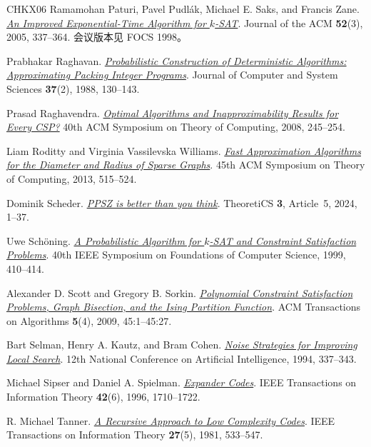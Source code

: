 \documentclass[11pt,reqno]{amsart}
\numberwithin{equation}{section}
\theoremstyle{definition}\newtheorem{definition}[theorem]{定义}
\theoremstyle{remark}\newtheorem{remark}[theorem]{注}
\begin{document}
\begin{thebibliography}{CHKX06}
Ramamohan Paturi, Pavel Pudl\'ak, Michael E. Saks, and Francis Zane.
\href{https://doi.org/10.1145/1066100.1066101}
{\emph{An Improved Exponential-Time Algorithm for $k$-SAT}}.
Journal of the ACM \textbf{52}(3), 2005, 337--364.
会议版本见 FOCS 1998。

Prabhakar Raghavan.
\href{https://doi.org/10.1016/0022-0000(88)90003-7}
{\emph{Probabilistic Construction of Deterministic Algorithms:
Approximating Packing Integer Programs}}.
Journal of Computer and System Sciences \textbf{37}(2), 1988, 130--143.

Prasad Raghavendra.
\href{https://doi.org/10.1145/1374376.1374414}
{\emph{Optimal Algorithms and Inapproximability Results for Every CSP?}}
40th ACM Symposium on Theory of Computing, 2008, 245--254.

Liam Roditty and Virginia Vassilevska Williams.
\href{https://doi.org/10.1145/2488608.2488673}
{\emph{Fast Approximation Algorithms for the Diameter and Radius of Sparse Graphs}}.
45th ACM Symposium on Theory of Computing, 2013, 515--524.

Dominik Scheder.
\href{https://doi.org/10.46298/theoretics.24.5}
{\emph{PPSZ is better than you think}}.
TheoretiCS \textbf{3}, Article~5, 2024, 1--37.

Uwe Sch\"oning.
\href{https://doi.org/10.1109/SFFCS.1999.814612}
{\emph{A Probabilistic Algorithm for $k$-SAT and Constraint Satisfaction
Problems}}.
40th IEEE Symposium on Foundations of Computer Science, 1999, 410--414.

Alexander D. Scott and Gregory B. Sorkin.
\href{https://doi.org/10.1145/1597036.1597049}
{\emph{Polynomial Constraint Satisfaction Problems, Graph Bisection,
and the Ising Partition Function}}.
ACM Transactions on Algorithms \textbf{5}(4), 2009, 45:1--45:27.

Bart Selman, Henry A. Kautz, and Bram Cohen.
\href{https://cdn.aaai.org/AAAI/1994/AAAI94-051.pdf}
{\emph{Noise Strategies for Improving Local Search}}.
12th National Conference on Artificial Intelligence, 1994, 337--343.

Michael Sipser and Daniel A. Spielman.
\href{https://doi.org/10.1109/18.556667}
{\emph{Expander Codes}}.
IEEE Transactions on Information Theory \textbf{42}(6), 1996, 1710--1722.

R. Michael Tanner.
\href{https://doi.org/10.1109/TIT.1981.1056404}
{\emph{A Recursive Approach to Low Complexity Codes}}.
IEEE Transactions on Information Theory \textbf{27}(5), 1981, 533--547.


\end{thebibliography}
\end{document}
